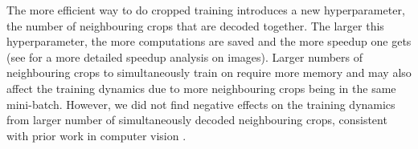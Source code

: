     The more efficient way to do cropped training introduces a new
hyperparameter, the number of neighbouring crops that are decoded
together. The larger this hyperparameter, the more computations are
saved and the more speedup one gets (see
\citet{giusti_fast_2013} for a more detailed speedup analysis
on images). Larger numbers of neighbouring crops to simultaneously train
on require more memory and may also affect the training dynamics due to
more neighbouring crops being in the same mini-batch. However, we did
not find negative effects on the training dynamics from larger number of
simultaneously decoded neighbouring crops, consistent with prior work in
computer vision \citep{shelhamer_fully_2016}.

